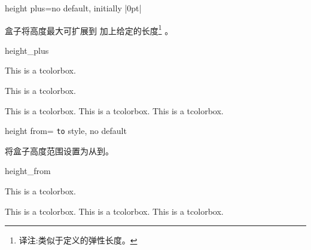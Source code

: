 \begin{docTcbKey}{height plus}{=}{no default, initially |0pt|}

盒子将高度最大可扩展到  加上给定的长度\footnote{译注:类似于定义的弹性长度。} 。
\begin{exdispExample}{height_plus}

\begin{tcolorbox}[height=1cm]
This is a tcolorbox.
\end{tcolorbox}
\begin{tcolorbox}[height=1cm,height plus=1cm]
This is a tcolorbox.
\end{tcolorbox}
\begin{tcolorbox}[height=1cm,height plus=1cm]
This is a tcolorbox. This is a tcolorbox. This is a tcolorbox.
\end{tcolorbox}
\end{exdispExample}
\end{docTcbKey}


\begin{docTcbKey}{height from}{= \texttt{to} }{style, no default}

将盒子高度范围设置为从到。
\begin{exdispExample}{height_from}

\begin{mybox}
This is a tcolorbox.
\end{mybox}
\begin{mybox}
This is a tcolorbox. This is a tcolorbox. This is a tcolorbox.
\end{mybox}
\begin{mybox}
\lipsum[2]
\end{mybox}
\end{exdispExample}
\end{docTcbKey}



